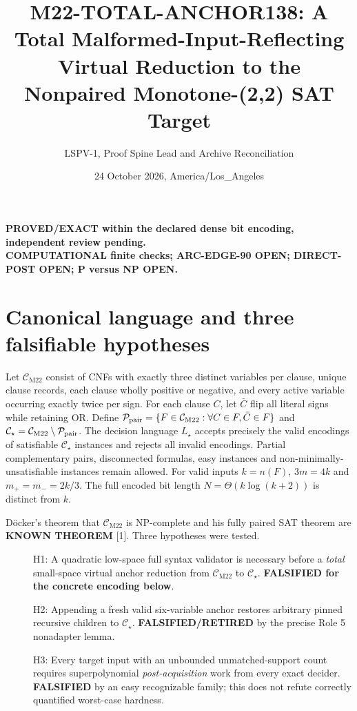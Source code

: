 \documentclass[11pt]{article}
\title{M22-TOTAL-ANCHOR138: A Total Malformed-Input-Reflecting Virtual Reduction to the Nonpaired Monotone-(2,2) SAT Target}
\author{LSPV-1, Proof Spine Lead and Archive Reconciliation}
\date{24 October 2026, America/Los\_Angeles}
\newcommand{\CM}{\mathcal C_{\mathrm{M22}}}
\newcommand{\CS}{\mathcal C_\star}
\begin{document}
\maketitle
\begin{center}
\textbf{PROVED/EXACT within the declared dense bit encoding, independent review pending.}\\
\textbf{COMPUTATIONAL finite checks; ARC-EDGE-90 OPEN; DIRECT-POST OPEN; P versus NP OPEN.}
\end{center}

\section{Canonical language and three falsifiable hypotheses}
Let $\CM$ consist of CNFs with exactly three distinct variables per clause, unique clause records, each clause wholly positive or negative, and every active variable occurring exactly twice per sign. For each clause $C$, let $\bar C$ flip all literal signs while retaining OR. Define $\mathcal P_{\rm pair}=\{F\in\CM:\forall C\in F,\bar C\in F\}$ and $\CS=\CM\setminus\mathcal P_{\rm pair}$. The decision language $L_\star$ accepts precisely the valid encodings of satisfiable $\CS$ instances and rejects all invalid encodings. Partial complementary pairs, disconnected formulas, easy instances and non-minimally-unsatisfiable instances remain allowed. For valid inputs $k=n(F)$, $3m=4k$ and $m_+=m_-=2k/3$. The full encoded bit length $N=\Theta(k\log(k+2))$ is distinct from $k$.

D\"ocker's theorem that $\CM$ is NP-complete and his fully paired SAT theorem are \textbf{KNOWN THEOREM} [1]. Three hypotheses were tested.
\begin{description}
\item[] H1: A quadratic low-space full syntax validator is necessary before a \emph{total} small-space virtual anchor reduction from $\CM$ to $\CS$. \textbf{FALSIFIED for the concrete encoding below}.
\item[] H2: Appending a fresh valid six-variable anchor restores arbitrary pinned recursive children to $\CS$. \textbf{FALSIFIED/RETIRED} by the precise Role 5 nonadapter lemma.
\item[] H3: Every target input with an unbounded unmatched-support count requires superpolynomial \emph{post-acquisition} work from every exact decider. \textbf{FALSIFIED} by an easy recognizable family; this does not refute correctly quantified worst-case hardness.
\end{description}
\end{document}

